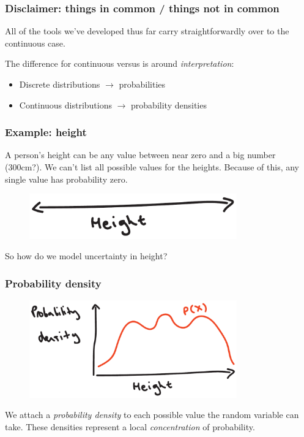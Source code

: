 \documentclass{beamer}
\begin{document}
	\begin{frame}
		\frametitle{Disclaimer: things in common / things not in common}
		
		All of the tools we've developed thus far carry straightforwardly over to the continuous case.
		
		\vspace{0.5cm}
		
		The difference for continuous versus is around \textit{interpretation}:
		
		\begin{itemize}
			\item Discrete distributions $\rightarrow$ probabilities
			\item Continuous distributions $\rightarrow$ probability densities
		\end{itemize}
		
	\end{frame}
	
	\begin{frame}
		\frametitle{Example: height}
		
		A person's height can be any value between near zero and a big number (300cm?). We can't list all possible values for the heights. Because of this, any single value has probability zero.
		
		\begin{figure}[ht]
			\centerline{\includegraphics[width=0.8\textwidth]{./figures/height_base.pdf}}
		\end{figure}
		
		So how do we model uncertainty in height?
		
	\end{frame}
	
	\begin{frame}
		\frametitle{Probability density}
		
		\begin{figure}[ht]
			\centerline{\includegraphics[width=0.8\textwidth]{./figures/height_density.pdf}}
		\end{figure}
		
		We attach a \textit{probability density} to each possible value the random variable can take. These densities represent a local \textit{concentration} of probability.
		
	\end{frame}
	
\end{document}
